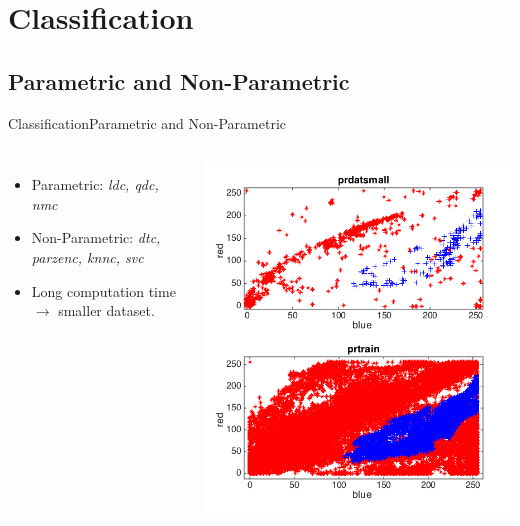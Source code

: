 \documentclass{beamer}
\begin{document}
\section{Classification}
\subsection{Parametric and Non-Parametric}
\begin{frame}{Classification}{Parametric and Non-Parametric}
    \begin{columns}
    \begin{itemize}
        \item Parametric: \emph{ldc, qdc, nmc}
        \item Non-Parametric: \emph{dtc, parzenc, knnc, svc}
        \item Long computation time $\rightarrow$ smaller dataset.
    \end{itemize}
        \includegraphics[scale=0.3]{prdat.png}
    \end{columns}
\end{frame}
\end{document}
